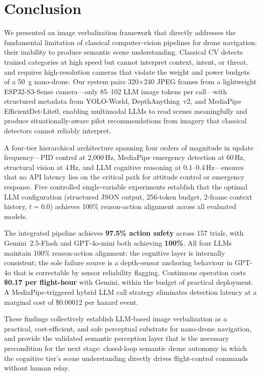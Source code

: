 \documentclass[journal]{IEEEtran}
\begin{document}
\section{Conclusion}
\label{sec:conclusion}

We presented an image verbalization framework that directly addresses the
fundamental limitation of classical computer-vision pipelines for drone
navigation: their inability to produce semantic scene understanding.
Classical CV detects trained categories at high speed but cannot interpret
context, intent, or threat, and requires high-resolution cameras that
violate the weight and power budgets of a \SI{50}{\gram} nano-drone.
Our system pairs 320$\times$240 JPEG frames from a lightweight
ESP32-S3-Sense camera---only 85--102 LLM image tokens per call---with
structured metadata from YOLO-World, DepthAnything~v2, and MediaPipe
EfficientDet-Lite0, enabling multimodal LLMs to read scenes meaningfully
and produce situationally-aware pilot recommendations from imagery that
classical detectors cannot reliably interpret.

A four-tier hierarchical architecture spanning four orders of magnitude
in update frequency---PID control at 2,000\,Hz, MediaPipe emergency
detection at 60\,Hz, structural vision at 4\,Hz, and LLM cognitive
reasoning at 0.1--0.4\,Hz---ensures that no API latency lies on the
critical path for attitude control or emergency response.
Five controlled single-variable experiments establish that the optimal
LLM configuration (structured JSON output, 256-token budget, 2-frame
context history, $t=0.0$) achieves 100\% reason-action alignment across
all evaluated models.

The integrated pipeline achieves \textbf{97.5\% action safety} across
157 trials, with Gemini~2.5-Flash and GPT-4o-mini both achieving
\textbf{100\%}.
All four LLMs maintain 100\% reason-action alignment: the cognitive
layer is internally consistent; the sole failure source is a
depth-sensor anchoring behaviour in GPT-4o that is correctable by
sensor reliability flagging.
Continuous operation costs \textbf{\$0.17 per flight-hour} with Gemini,
within the budget of practical deployment.
A MediaPipe-triggered hybrid LLM call strategy eliminates detection
latency at a marginal cost of \$0.00012 per hazard event.

These findings collectively establish LLM-based image verbalization as
a practical, cost-efficient, and safe perceptual substrate for nano-drone
navigation, and provide the validated semantic perception layer that is
the necessary precondition for the next stage: closed-loop semantic drone
autonomy in which the cognitive tier's scene understanding directly drives
flight-control commands without human relay.
\end{document}

